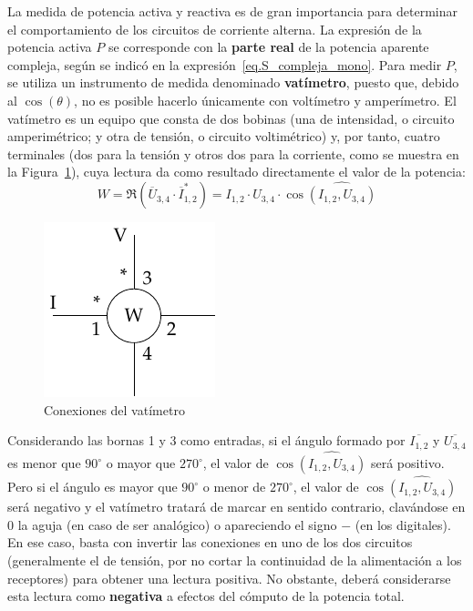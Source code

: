 	La medida de potencia activa y reactiva es de gran importancia para determinar el comportamiento de los circuitos de corriente alterna. La expresión de la potencia activa $P$ se corresponde con la \textbf{parte real} de la potencia aparente compleja, según se indicó en la expresión~\eqref{eq.S_compleja_mono}. Para medir $P$, se utiliza un instrumento de medida denominado \textbf{vatímetro}, puesto que, debido al $\cos(\theta)$, no es posible hacerlo únicamente con voltímetro y amperímetro. El vatímetro es un equipo que consta de dos bobinas (una de intensidad, o circuito amperimétrico; y otra de tensión, o circuito voltimétrico) y, por tanto, cuatro terminales (dos para la tensión y otros dos para la corriente, como se muestra en la Figura~\ref{fig.vatimetro_2}), cuya lectura da como resultado directamente el valor de la potencia:
	\begin{equation*}
	    W=\Re(\overline{U}_{3,4} \cdot \overline{I}_{1,2}^*)=I_{1,2}\cdot U_{3,4}\cdot \cos\widehat{(I_{1,2}, U_{3,4})}
	\end{equation*}%
	
	\begin{figure}[H]
	    \centering
	    \includegraphics{../figs/vatimetro_2.pdf}
	    \caption{Conexiones del vatímetro}
	    \label{fig.vatimetro_2}
	\end{figure}
	Considerando las bornas 1 y 3 como entradas, si el ángulo formado por $\overline{I_{1,2}}$ y $\overline{U_{3,4}}$ es menor que $90^\circ$ o mayor que $270^\circ$, el valor de $\cos\widehat{(I_{1,2}, U_{3,4})}$ será positivo. Pero si el ángulo es mayor que $90^\circ$ o menor de $270^\circ$, el valor de  $\cos\widehat{(I_{1,2}, U_{3,4})}$ será negativo y el vatímetro tratará de marcar en sentido contrario, clavándose en $0$ la aguja (en caso de ser analógico) o apareciendo el signo $-$ (en los digitales). En ese caso, basta con invertir las conexiones en uno de los dos circuitos (generalmente el de tensión, por no cortar la continuidad de la alimentación a los receptores) para obtener una lectura positiva. No obstante, deberá considerarse esta lectura como \textbf{negativa} a efectos del cómputo de la potencia total. 
	
